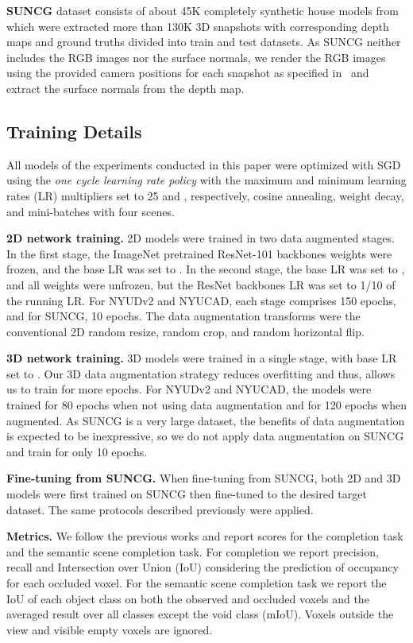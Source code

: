 \textbf{SUNCG} dataset consists of about 45K completely synthetic house models from which were extracted more than 130K 3D snapshots with corresponding depth maps and ground truths divided into train and test datasets. As SUNCG neither includes the RGB images nor the surface normals, we render the RGB images using the provided camera positions for each snapshot as specified in~\cite{edgnet} and extract the surface normals from the depth map. 


\subsection{Training Details}
All models of the experiments conducted in this paper were optimized with SGD using the \emph{one cycle learning rate policy} \cite{Smith_2018} with the maximum and minimum learning rates (LR) multipliers set to 25 and , respectively, cosine annealing,  weight decay, and mini-batches with four scenes. 

\textbf{2D network training.} 2D models were trained in two data augmented stages. In the first stage, the ImageNet pretrained ResNet-101 backbones weights were frozen, and the base LR was set to . In the second stage, the base LR was set to , and all weights were unfrozen, but the ResNet backbones LR was set to 1/10 of the running LR. For NYUDv2 and NYUCAD, each stage comprises 150 epochs, and for SUNCG, 10 epochs. The data augmentation transforms were the conventional 2D random resize, random crop, and random horizontal flip.

\textbf{3D network training.} 3D models were trained in a single stage, with base LR set to . 
Our 3D data augmentation strategy reduces overfitting and thus, allows us to train for more epochs. For NYUDv2 and NYUCAD, the models were trained for 80 epochs when not using data augmentation and for 120 epochs when augmented. As SUNCG is a very large dataset, the benefits of data augmentation is expected to be inexpressive, so we do not apply data augmentation on SUNCG and train for only 10 epochs.

\textbf{Fine-tuning from SUNCG.} When fine-tuning from SUNCG, both 2D and 3D models were first trained on SUNCG then fine-tuned to the desired target dataset. The same protocols described previously were applied.

\textbf{Metrics.}
We follow the previous works and report scores for the completion task and the semantic scene completion task. For completion we report precision, recall and Intersection over Union (IoU) considering the prediction of occupancy for each occluded voxel. For the semantic scene completion task we report the IoU of each object class on both the observed and occluded voxels and the averaged result over all classes except the void class (mIoU). 
Voxels outside the view and visible empty voxels are ignored.
